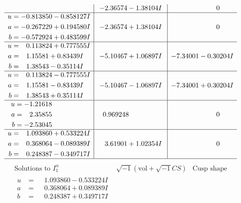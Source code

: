 \documentclass[1p]{elsarticle_modified}
\theoremstyle{definition}
\newcommand{\I}{\sqrt{-1}}
\begin{document}
$$\begin{array}{c|c|c}
 & -2.36574 - 1.38104 I & \phantom{-0.000000 } 0 \\ \hline\begin{aligned}
u &= -0.813850 - 0.858127 I \\
a &= -0.267229 + 0.194580 I \\
b &= -0.572924 + 0.483599 I\end{aligned}
 & -2.36574 + 1.38104 I & \phantom{-0.000000 } 0 \\ \hline\begin{aligned}
u &= \phantom{-}0.113824 + 0.777555 I \\
a &= \phantom{-}1.15581 + 0.83439 I \\
b &= \phantom{-}1.38543 - 0.35114 I\end{aligned}
 & -5.10467 + 1.06897 I & -7.34001 - 0.30204 I \\ \hline\begin{aligned}
u &= \phantom{-}0.113824 - 0.777555 I \\
a &= \phantom{-}1.15581 - 0.83439 I \\
b &= \phantom{-}1.38543 + 0.35114 I\end{aligned}
 & -5.10467 - 1.06897 I & -7.34001 + 0.30204 I \\ \hline\begin{aligned}
u &= -1.21618\phantom{ +0.000000I} \\
a &= \phantom{-}2.35855\phantom{ +0.000000I} \\
b &= -2.53045\phantom{ +0.000000I}\end{aligned}
 & \phantom{-}0.969248\phantom{ +0.000000I} & \phantom{-0.000000 } 0 \\ \hline\begin{aligned}
u &= \phantom{-}1.093860 + 0.533224 I \\
a &= \phantom{-}0.368064 - 0.089389 I \\
b &= \phantom{-}0.248387 - 0.349717 I\end{aligned}
 & \phantom{-}3.61901 + 1.02354 I & \phantom{-0.000000 } 0\\
 \hline 
 \end{array}$$\newpage$$\begin{array}{c|c|c}  
\text{Solutions to }I^u_{1}& \I (\text{vol} + \sqrt{-1}CS) & \text{Cusp shape}\\
 \hline 
\begin{aligned}
u &= \phantom{-}1.093860 - 0.533224 I \\
a &= \phantom{-}0.368064 + 0.089389 I \\
b &= \phantom{-}0.248387 + 0.349717 I\end{aligned}

\end{array}$$
\end{document}
